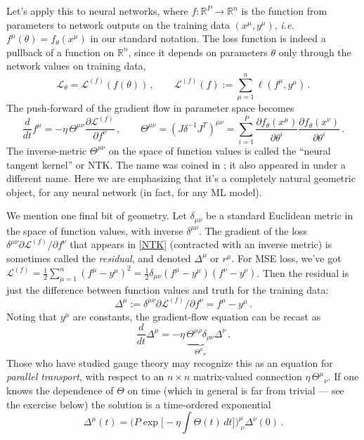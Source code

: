 \documentclass[11pt]{article}
\newcommand{\R}{\mathbb{R}}
\newcommand{\CL}{{\mathcal L}}
\newcommand{\pd}{\partial}
\begin{document}
Let's apply this to neural networks, where $f:\R^P\to \R^n$ is the function from parameters to network outputs on the training data $(x^\mu,y^\mu)$, \emph{i.e.} $f^\mu(\theta) = f_\theta(x^\mu)$ in our standard notation. The loss function is indeed a pullback of a function on $\R^n$, since it depends on parameters $\theta$ only through the network values on training data,
%
\begin{equation}
    \CL_\theta = \CL^{(f)}(f(\theta))\,,\qquad \CL^{(f)}(f) := \sum_{\mu=1}^n \ell( f^\mu,y^\mu)\,.
\end{equation}
%
The push-forward of the gradient flow in parameter space becomes
%
\begin{equation}
    \frac{d}{dt} f^\mu = -\eta\, \Theta^{\mu\nu} \frac{\partial \CL^{(f)}}{\partial f^\nu}\,,\qquad \Theta^{\mu\nu} = (J \delta^{-1} J^T)^{\mu\nu} = \sum_{i=1}^P \frac{\partial f_\theta(x^\mu)}{\partial \theta^i}\frac{\partial f_\theta(x^\nu)}{\partial \theta^i}\,. \label{NTK}
\end{equation}
%
The inverse-metric $\Theta^{\mu\nu}$ on the space of function values is called the ``neural tangent kernel'' or NTK. The name was coined in \cite{jacot2018neural}; it also appeared in \cite{du2019gradient} under a different name. Here we are emphasizing that it's a completely natural geometric object, for any neural network (in fact, for any ML model).

We mention one final bit of geometry. Let $\delta_{\mu\nu}$ be a standard Euclidean metric in the space of function values, with inverse $\delta^{\mu\nu}$. The gradient of the loss $\delta^{\mu\nu}\pd \CL^{(f)}/\pd f^\nu$ that appears in \eqref{NTK} (contracted with an inverse metric) is sometimes called the \emph{residual}, and denoted $\Delta^\mu$ or $r^\mu$. For MSE loss, we've got $\CL^{(f)} = \frac{1}{2} \sum_{\mu=1}^n (f^\mu-y^\mu)^2 = \frac{1}{2}\delta_{\mu\nu}(f^\mu-y^\mu)(f^\nu-y^\nu)$. Then the residual is just the difference between function values and truth for the training data:
%
\begin{equation} \Delta^\mu := \delta^{\mu\nu}\pd \CL^{(f)}/\pd f^\nu  = f^\mu-y^\mu\,. \end{equation}
%
Noting that $y^\mu$ are constants, the gradient-flow equation can be recast as
%
\begin{equation} \frac{d}{dt} \Delta^\mu = - \eta\, \underbrace{\Theta^{\mu\rho}\delta_{\rho\nu}}_{\displaystyle \Theta^\mu{}_{\nu}}\Delta^\nu\,. \label{GF-Delta} \end{equation}
%
Those who have studied gauge theory may recognize this as an equation for \emph{parallel transport}, with respect to an $n\times n$ matrix-valued connection $\eta\,\Theta^\mu{}_\nu$. 
If one knows the dependence of $\Theta$ on time (which in general is far from trivial --- see the exercise below) the solution is a time-ordered exponential
%
\begin{equation}
    \Delta^\mu(t) = \bigg(P\exp\bigg[-\eta\int \Theta(t)\,dt\bigg]\bigg)^\mu_{\;\nu} \Delta^\nu(0)\,.
\end{equation}
\end{document}
